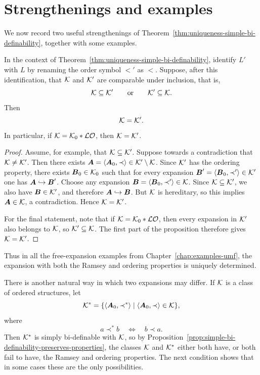 \section{Strengthenings and examples}

We now record two useful strengthenings of Theorem~\ref{thm:uniqueness-simple-bi-definability}, together with some examples.

\begin{proposition}
    \label{prop:comparable-expansions-equal}
    In the context of Theorem~\ref{thm:uniqueness-simple-bi-definability}, identify \(L'\) with \(L\) by renaming the order symbol \(<'\) as \(<\). Suppose, after this identification, that \(\mathcal{K}\) and \(\mathcal{K}'\) are comparable under inclusion, that is,
    \[
        \mathcal{K}\subseteq \mathcal{K}'
        \qquad\text{or}\qquad
        \mathcal{K}'\subseteq \mathcal{K}.
    \]
    Then
    \[
        \mathcal{K}=\mathcal{K}'.
    \]
    In particular, if \(\mathcal{K}=\mathcal{K}_0 * \mathcal{LO}\),
    then \(\mathcal{K}=\mathcal{K}'\).
\end{proposition}

\begin{proof}
    Assume, for example, that \(\mathcal{K}\subseteq \mathcal{K}'\).
    Suppose towards a contradiction that \(\mathcal{K}\neq\mathcal{K}'\). Then there exists
    \(\boldsymbol{A}=\langle \boldsymbol{A}_0,\prec\rangle\in \mathcal{K}'\setminus \mathcal{K}\).
    Since \(\mathcal{K}'\) has the ordering property, there exists
    \(\boldsymbol{B}_0\in \mathcal{K}_0\)
    such that for every expansion
    \(\boldsymbol{B}'=\langle \boldsymbol{B}_0,\prec'\rangle\in \mathcal{K}'\)
    one has
    \(\boldsymbol{A}\hookrightarrow \boldsymbol{B}'\).
    Choose any expansion
    \(\boldsymbol{B}=\langle \boldsymbol{B}_0,\prec'\rangle\in \mathcal{K}\).
    Since \(\mathcal{K}\subseteq \mathcal{K}'\), we also have \(\boldsymbol{B}\in\mathcal{K}'\), and therefore
    \(\boldsymbol{A}\hookrightarrow \boldsymbol{B}\).
    But \(\mathcal{K}\) is hereditary, so this implies
    \(\boldsymbol{A}\in \mathcal{K}\),
    a contradiction. Hence \(\mathcal{K}=\mathcal{K}'\).

    For the final statement, note that if \(\mathcal{K}=\mathcal{K}_0 * \mathcal{LO}\),
    then every expansion in \(\mathcal{K}'\) also belongs to \(\mathcal{K}\), so
    \(\mathcal{K}'\subseteq \mathcal{K}\).
    The first part of the proposition therefore gives \(\mathcal{K}=\mathcal{K}'\).
\end{proof}

Thus in all the free-expansion examples from Chapter~\ref{chap:examples-umf}, the expansion with both the Ramsey and ordering properties is uniquely determined.

There is another natural way in which two expansions may differ. If \(\mathcal{K}\) is a class of ordered structures, let
\[
    \mathcal{K}^*=\{\langle \boldsymbol{A}_0,\prec^*\rangle \mid \langle \boldsymbol{A}_0,\prec\rangle\in \mathcal{K}\},
\]
where
\[
    a\prec^* b
    \quad\Longleftrightarrow\quad
    b\prec a.
\]
Then \(\mathcal{K}^*\) is simply bi-definable with \(\mathcal{K}\), so by Proposition~\ref{prop:simple-bi-definability-preserves-properties}, the classes \(\mathcal{K}\) and \(\mathcal{K}^*\) either both have, or both fail to have, the Ramsey and ordering properties. The next condition shows that in some cases these are the only possibilities.

